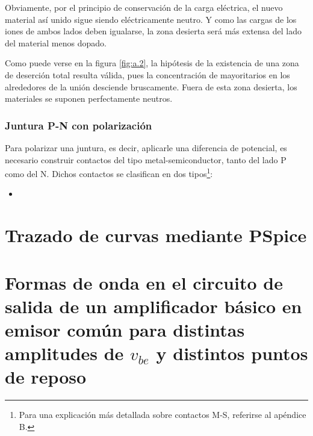 \documentclass{book} %
\begin{document}
\begin{appendices}
Obviamente, por el principio de conservación de la carga eléctrica, el nuevo material así unido sigue siendo eléctricamente neutro. Y como las cargas de los iones de ambos lados deben igualarse, la zona desierta será más extensa del lado del material menos dopado.

Como puede verse en la figura \ref{fig:a.2}, la hipótesis de la existencia de una zona de deserción total resulta válida, pues la concentración de mayoritarios en los alrededores de la unión desciende bruscamente. Fuera de esta zona desierta, los materiales se suponen perfectamente neutros.

\subsection{Juntura P-N con polarización}

Para polarizar una juntura, es decir, aplicarle una diferencia de potencial, es necesario construir contactos del tipo metal-semiconductor, tanto del lado P como del N. Dichos contactos se clasifican en dos tipos\footnote{Para una explicación más detallada sobre contactos M-S, referirse al apéndice B.}:
\begin{itemize}
	\item 
\end{itemize}






\chapter{Trazado de curvas mediante PSpice}
\chapter{Formas de onda en el circuito de salida de un amplificador básico en emisor común para distintas amplitudes de $v_{be}$ y distintos puntos de reposo}

\end{appendices}
\end{document}
